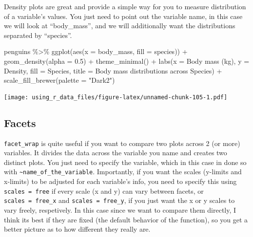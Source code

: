 \documentclass[
]{book}
\newenvironment{Shaded}{\begin{snugshade}}{\end{snugshade}}
\newcommand{\AttributeTok}[1]{\textcolor[rgb]{0.77,0.63,0.00}{#1}}
\newcommand{\FloatTok}[1]{\textcolor[rgb]{0.00,0.00,0.81}{#1}}
\newcommand{\FunctionTok}[1]{\textcolor[rgb]{0.00,0.00,0.00}{#1}}
\newcommand{\NormalTok}[1]{#1}
\newcommand{\SpecialCharTok}[1]{\textcolor[rgb]{0.00,0.00,0.00}{#1}}
\newcommand{\StringTok}[1]{\textcolor[rgb]{0.31,0.60,0.02}{#1}}
\begin{document}
Density plots are great and provide a simple way for you to measure distribution of a variable's values.
You just need to point out the variable name, in this case we will look at ``body\_mass'', and we will additionally want the distributions separated by ``species''.

\begin{Shaded}
\begin{Highlighting}[]
\NormalTok{penguins }\SpecialCharTok{\%\textgreater{}\%} 
  \FunctionTok{ggplot}\NormalTok{(}\FunctionTok{aes}\NormalTok{(}\AttributeTok{x =}\NormalTok{ body\_mass, }\AttributeTok{fill =}\NormalTok{ species)) }\SpecialCharTok{+} 
  \FunctionTok{geom\_density}\NormalTok{(}\AttributeTok{alpha =} \FloatTok{0.5}\NormalTok{) }\SpecialCharTok{+}
  \FunctionTok{theme\_minimal}\NormalTok{() }\SpecialCharTok{+}
  \FunctionTok{labs}\NormalTok{(}\AttributeTok{x =} \StringTok{\textquotesingle{}Body mass (kg)\textquotesingle{}}\NormalTok{, }\AttributeTok{y =} \StringTok{\textquotesingle{}Density\textquotesingle{}}\NormalTok{,}
       \AttributeTok{fill =} \StringTok{\textquotesingle{}Species\textquotesingle{}}\NormalTok{, }
       \AttributeTok{title =} \StringTok{\textquotesingle{}Body mass distributions across Species\textquotesingle{}}\NormalTok{) }\SpecialCharTok{+}
  \FunctionTok{scale\_fill\_brewer}\NormalTok{(}\AttributeTok{palette =} \StringTok{"Dark2"}\NormalTok{)}
\end{Highlighting}
\end{Shaded}

\texttt{[image: using\_r\_data\_files/figure-latex/unnamed-chunk-105-1.pdf]}

\hypertarget{facets}{%
\subsection{Facets}\label{facets}}

\texttt{facet\_wrap} is quite useful if you want to compare two plots across 2 (or more) variables.
It divides the data across the variable you name and creates two distinct plots.
You just need to specify the variable, which in this case in done so with \texttt{\textasciitilde{}name\_of\_the\_variable}.
Importantly, if you want the scales (y-limits and x-limits) to be adjusted for each variable's info, you need to specify this using \texttt{scales\ =\ \textquotesingle{}free\textquotesingle{}} if every scale (x and y) can vary between facets, or \texttt{scales\ =\ \textquotesingle{}free\_x\textquotesingle{}} and \texttt{scales\ =\ \textquotesingle{}free\_y\textquotesingle{}}, if you just want the x or y scales to vary freely, respetively.
In this case since we want to compare them directly, I think its best if they are fixed (the default behavior of the function), so you get a better picture as to how different they really are.
\end{document}
